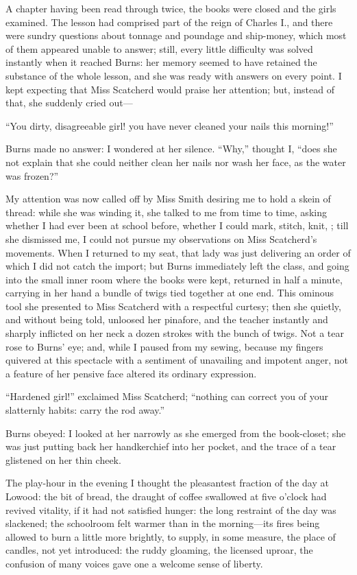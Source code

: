 A chapter having been read through twice, the books were closed and the
girls examined.  The lesson had comprised part of the reign of Charles
I., and there were sundry questions about tonnage and poundage and
ship-money, which most of them appeared unable to answer; still, every
little difficulty was solved instantly when it reached Burns: her memory
seemed to have retained the substance of the whole lesson, and she was
ready with answers on every point.  I kept expecting that Miss Scatcherd
would praise her attention; but, instead of that, she suddenly cried
out---

\enquote{You dirty, disagreeable girl! you have never cleaned your nails
	this morning!}

Burns made no answer: I wondered at her silence.  \enquote{Why,} thought
I, \enquote{does she not explain that she could neither clean her nails
	nor wash her face, as the water was frozen?}

My attention was now called off by Miss Smith desiring me to hold a
skein of thread: while she was winding it, she talked to me from time to
time, asking whether I had ever been at school before, whether I could
mark, stitch, knit, \etc; till she dismissed me, I could not pursue my
observations on Miss Scatcherd's movements.  When I returned to my seat,
that lady was just delivering an order of which I did not catch the
import; but Burns immediately left the class, and going into the small
inner room where the books were kept, returned in half a minute,
carrying in her hand a bundle of twigs tied together at one end.  This
ominous tool she presented to Miss Scatcherd with a respectful curtesy;
then she quietly, and without being told, unloosed her pinafore, and the
teacher instantly and sharply inflicted on her neck a dozen strokes with
the bunch of twigs.  Not a tear rose to Burns' eye; and, while I paused
from my sewing, because my fingers quivered at this spectacle with a
sentiment of unavailing and impotent anger, not a feature of her pensive
face altered its ordinary expression.

\enquote{Hardened girl!} exclaimed Miss Scatcherd; \enquote{nothing can
	correct you of your slatternly habits: carry the rod away.}

Burns obeyed: I looked at her narrowly as she emerged from the
book-closet; she was just putting back her handkerchief into her pocket,
and the trace of a tear glistened on her thin cheek.

The play-hour in the evening I thought the pleasantest fraction of the
day at Lowood: the bit of bread, the draught of coffee swallowed at five
o'clock had revived vitality, if it had not satisfied hunger: the long
restraint of the day was slackened; the schoolroom felt warmer than in
the morning---its fires being allowed to burn a little more brightly, to
supply, in some measure, the place of candles, not yet introduced: the
ruddy gloaming, the licensed uproar, the confusion of many voices gave
one a welcome sense of liberty.


